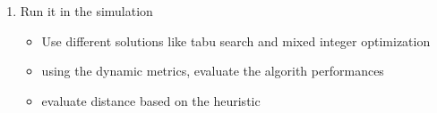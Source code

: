 \begin{enumerate}
		\item Run it in the simulation
		\begin{itemize}
			\item Use different solutions like tabu search and mixed integer optimization
			\item using the dynamic metrics, evaluate the algorith performances
			\item evaluate distance based on the heuristic
		\end{itemize}
		
		
\end{enumerate}